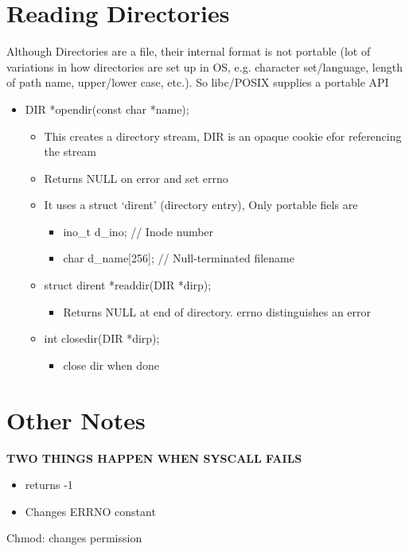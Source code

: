 \section{Reading Directories}
Although Directories are a file, their internal format is not portable (lot of variations in how directories are set up in OS, e.g. character set/language, length of path name, upper/lower case, etc.). So libc/POSIX supplies a portable API
\begin{itemize}
    \item DIR *opendir(const char *name);
    \begin{itemize}
        \item This creates a directory stream, DIR is an opaque cookie efor referencing the stream
        \item Returns NULL on error and set errno
        \item It uses a struct `dirent' (directory entry), Only portable fiels are
        \begin{itemize}
            \item ino\_t d\_ino; // Inode number
            \item char d\_name[256]; // Null-terminated filename
        \end{itemize}
        \item struct dirent *readdir(DIR *dirp);
        \begin{itemize}
            \item Returns NULL at end of directory. errno distinguishes an error
        \end{itemize}
        \item int closedir(DIR *dirp);
        \begin{itemize}
            \item close dir when done
        \end{itemize}
    \end{itemize}
\end{itemize}

\section{Other Notes}
\textbf{TWO THINGS HAPPEN WHEN SYSCALL FAILS}
\begin{itemize}
    \item returns -1
    \item Changes ERRNO constant
\end{itemize}
Chmod: changes permission

